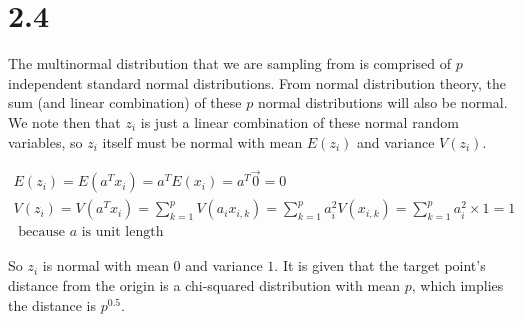 \section*{2.4}

\noindent
The multinormal distribution that we are sampling from is comprised of $p$
independent standard normal distributions. From normal distribution theory, the 
sum (and linear combination) of these $p$ normal distributions will also be 
normal. We note then that $z_{i}$ is just a linear combination of these normal 
random variables, so $z_{i}$ itself must be normal with mean $E(z_{i})$ and 
variance $V(z_{i})$.

\begin{gather*}
E(z_{i}) = 
E(a^{T} x_{i}) = 
a^{T} E(x_{i}) = 
a^{T} \overrightarrow{0} = 
0 \\ 
V(z_{i}) = 
V(a^{T} x_{i}) = 
\sum_{k = 1}^{p} V(a_{i} x_{i, k}) = 
\sum_{k = 1}^{p} a_{i}^{2} V(x_{i, k}) = 
\sum_{k = 1}^{p} a_{i}^{2} \times 1 = 
1 \\
\text{ because } a \text{ is unit length}
\end{gather*}

\noindent
So $z_{i}$ is normal with mean $0$ and variance $1$. It is given that the target 
point's distance from the origin is a chi-squared distribution with mean $p$, 
which implies the distance is $p^{0.5}$.